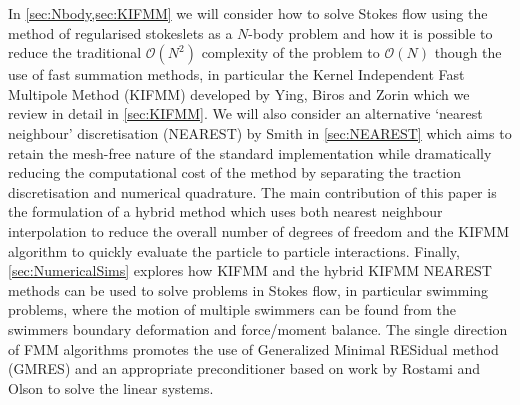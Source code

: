 In \cref{sec:Nbody,sec:KIFMM} we will consider how to solve Stokes flow using the method of regularised stokeslets as a $N$-body problem and how it is possible to reduce the traditional $\mathcal{O}(N^2)$ complexity of the problem to $\mathcal{O}(N)$ though the use of fast summation methods, in particular the Kernel Independent Fast Multipole Method (KIFMM) developed by Ying, Biros and Zorin \cite{Ying2004,Rostami2016Kernel-independentStokeslets,Rostami2019FastBiofluids} which we review in detail in \cref{sec:KIFMM}. We will also consider an alternative `nearest neighbour' discretisation (NEAREST) by Smith \cite{Smith2018AEquation,Gallagher2020,Gallagher2018MeshfreeCells} in \cref{sec:NEAREST} which aims to retain the mesh-free nature  of the standard implementation while dramatically reducing the computational cost of the method by separating the traction discretisation and numerical quadrature. The main contribution of this paper is the formulation of a hybrid method which uses both nearest neighbour interpolation to reduce the overall number of degrees of freedom and the KIFMM algorithm to quickly evaluate the particle to particle interactions. Finally, \cref{sec:NumericalSims} explores how KIFMM and the hybrid KIFMM NEAREST methods can be used to solve problems in Stokes flow, in particular swimming problems, where the motion of multiple swimmers can be found from the swimmers boundary deformation and force/moment balance. The single direction of FMM algorithms promotes the use of Generalized Minimal RESidual method (GMRES) and an appropriate preconditioner based on work by Rostami and Olson \cite{Rostami2019FastBiofluids} to solve the linear systems.